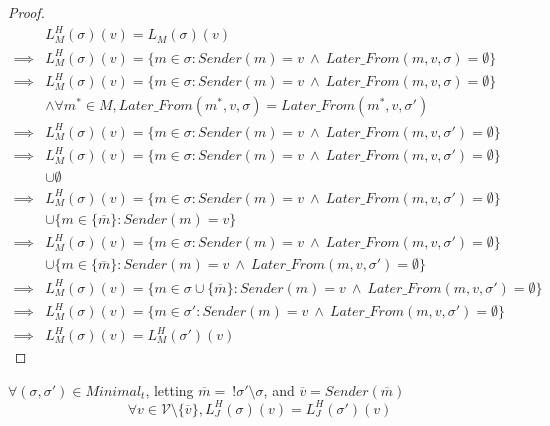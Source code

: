 \begin{proof}
\begin{align}
        &L^H_M(\sigma)(v) = L_M(\sigma)(v) \\
\implies&L^H_M(\sigma)(v) = \{m \in \sigma : Sender(m) = v ~\land~ Later\_From(m,v,\sigma) = \emptyset\} \\
\implies&L^H_M(\sigma)(v) = \{m \in \sigma : Sender(m) = v ~\land~ Later\_From(m,v,\sigma) = \emptyset\} \\
        &\land \forall m^* \in M, Later\_From(m^*,v,\sigma) = Later\_From(m^*,v,\sigma')\\
\implies&L^H_M(\sigma)(v) = \{m \in \sigma : Sender(m) = v ~\land~ Later\_From(m,v,\sigma') = \emptyset\} \\
\implies&L^H_M(\sigma)(v) = \{m \in \sigma : Sender(m) = v ~\land~ Later\_From(m,v,\sigma') = \emptyset\} \\
        &\cup \emptyset \\
\implies&L^H_M(\sigma)(v) = \{m \in \sigma : Sender(m) = v ~\land~ Later\_From(m,v,\sigma') = \emptyset\} \\
        &\cup \{m \in \{\overline{m}\} : Sender(m) = v\} \\
\implies&L^H_M(\sigma)(v) = \{m \in \sigma : Sender(m) = v ~\land~ Later\_From(m,v,\sigma') = \emptyset\} \\
        &\cup \{m \in \{\overline{m}\} : Sender(m) = v ~\land~ Later\_From(m,v,\sigma') = \emptyset\} \\
\implies&L^H_M(\sigma)(v) = \{m \in \sigma \cup \{\overline{m}\}: Sender(m) = v ~\land~ Later\_From(m,v,\sigma') = \emptyset\} \\
\implies&L^H_M(\sigma)(v) = \{m \in \sigma': Sender(m) = v ~\land~ Later\_From(m,v,\sigma') = \emptyset\} \\
\implies&L^H_M(\sigma)(v) = L^H_M(\sigma')(v)
\end{align}
\end{proof}

\begin{lemma}
$\forall (\sigma, \sigma') \in Minimal_t$, letting $\overline{m} =~!\sigma'\setminus\sigma$, and $\overline{v} = Sender(\overline{m})$
$$
\forall v \in \mathcal{V} \setminus \{\overline{v}\}, L^H_J(\sigma)(v) = L^H_J(\sigma')(v)
$$
\end{lemma}

